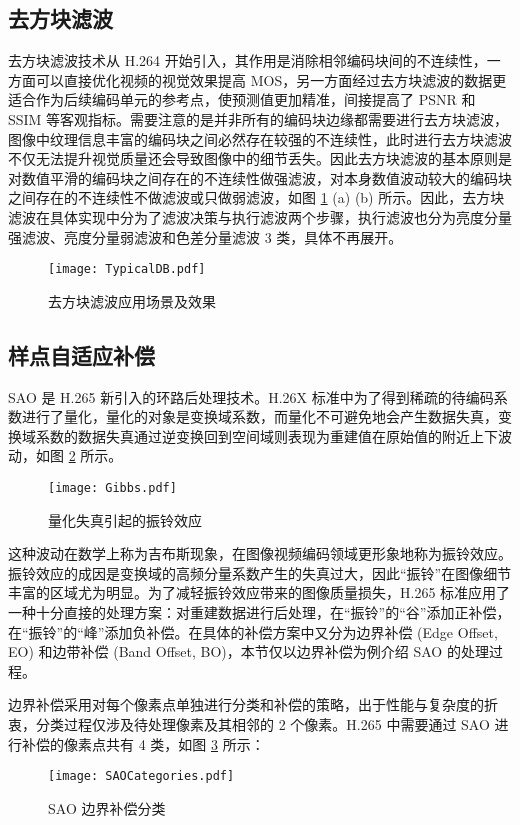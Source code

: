 \subsection{去方块滤波}
去方块滤波技术从 H.264 开始引入，其作用是消除相邻编码块间的不连续性，一方面可以直接优化视频的视觉效果提高 MOS，另一方面经过去方块滤波的数据更适合作为后续编码单元的参考点，使预测值更加精准，间接提高了 PSNR 和 SSIM 等客观指标。需要注意的是并非所有的编码块边缘都需要进行去方块滤波，图像中纹理信息丰富的编码块之间必然存在较强的不连续性，此时进行去方块滤波不仅无法提升视觉质量还会导致图像中的细节丢失。因此去方块滤波的基本原则是对数值平滑的编码块之间存在的不连续性做强滤波，对本身数值波动较大的编码块之间存在的不连续性不做滤波或只做弱滤波，如图 \ref{fig:TypicalDB} (a) (b) 所示。因此，去方块滤波在具体实现中分为了滤波决策与执行滤波两个步骤，执行滤波也分为亮度分量强滤波、亮度分量弱滤波和色差分量滤波 3 类，具体不再展开。
\begin{figure}[htb]
    \centering
    \texttt{[image: TypicalDB.pdf]}
    \caption{去方块滤波应用场景及效果}
    \label{fig:TypicalDB}
\end{figure}

\subsection{样点自适应补偿}
SAO 是 H.265 新引入的环路后处理技术。H.26X 标准中为了得到稀疏的待编码系数进行了量化，量化的对象是变换域系数，而量化不可避免地会产生数据失真，变换域系数的数据失真通过逆变换回到空间域则表现为重建值在原始值的附近上下波动，如图 \ref{fig:Gibbs} 所示。
\begin{figure}[htb]
    \centering
    \texttt{[image: Gibbs.pdf]}
    \caption{量化失真引起的振铃效应}
    \label{fig:Gibbs}
\end{figure}

这种波动在数学上称为吉布斯现象，在图像视频编码领域更形象地称为振铃效应。振铃效应的成因是变换域的高频分量系数产生的失真过大，因此“振铃”在图像细节丰富的区域尤为明显。为了减轻振铃效应带来的图像质量损失，H.265 标准应用了一种十分直接的处理方案：对重建数据进行后处理，在“振铃”的“谷”添加正补偿，在“振铃”的“峰”添加负补偿。在具体的补偿方案中又分为边界补偿 (Edge Offset, EO) 和边带补偿 (Band Offset, BO)，本节仅以边界补偿为例介绍 SAO 的处理过程。

边界补偿采用对每个像素点单独进行分类和补偿的策略，出于性能与复杂度的折衷，分类过程仅涉及待处理像素及其相邻的 2 个像素。H.265 中需要通过 SAO 进行补偿的像素点共有 4 类，如图 \ref{fig:SAOCategories} 所示：
\begin{figure}[htb]
    \centering
    \texttt{[image: SAOCategories.pdf]}
    \caption{SAO 边界补偿分类}
    \label{fig:SAOCategories}
\end{figure}

